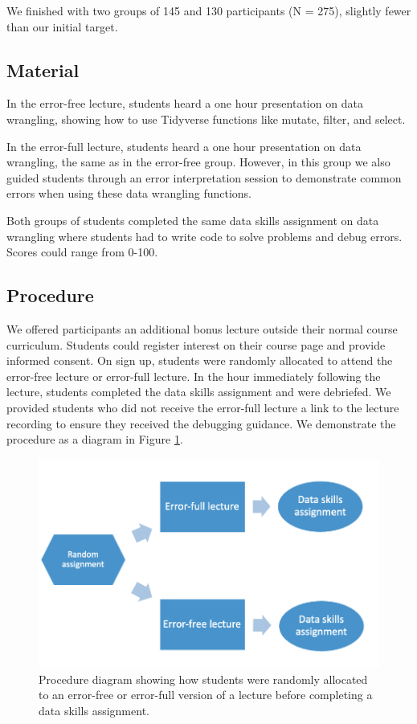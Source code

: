 \documentclass[
  man,floatsintext]{apa6}
\begin{document}
We finished with two groups of 145 and 130 participants (N = 275), slightly fewer than our initial target.

\hypertarget{material}{%
\subsection{Material}\label{material}}

In the error-free lecture, students heard a one hour presentation on data wrangling, showing how to use Tidyverse functions like mutate, filter, and select.

In the error-full lecture, students heard a one hour presentation on data wrangling, the same as in the error-free group. However, in this group we also guided students through an error interpretation session to demonstrate common errors when using these data wrangling functions.

Both groups of students completed the same data skills assignment on data wrangling where students had to write code to solve problems and debug errors. Scores could range from 0-100.

\hypertarget{procedure}{%
\subsection{Procedure}\label{procedure}}

We offered participants an additional bonus lecture outside their normal course curriculum. Students could register interest on their course page and provide informed consent. On sign up, students were randomly allocated to attend the error-free lecture or error-full lecture. In the hour immediately following the lecture, students completed the data skills assignment and were debriefed. We provided students who did not receive the error-full lecture a link to the lecture recording to ensure they received the debugging guidance. We demonstrate the procedure as a diagram in Figure \ref{fig:procedure-diagram}.



\begin{figure}
\includegraphics[width=1\linewidth]{Figures/procedure_diagram} \caption{Procedure diagram showing how students were randomly allocated to an error-free or error-full version of a lecture before completing a data skills assignment.}\label{fig:procedure-diagram}
\end{figure}
\end{document}

